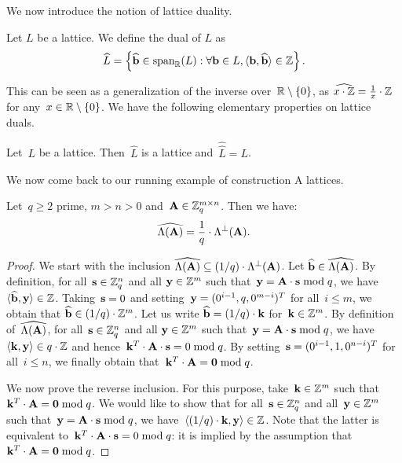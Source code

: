 We now introduce the notion of lattice duality. 

\begin{definition}
\label{def:dual}
Let $L$ be a lattice. We define the dual of $L$ as 
\[
\widehat{L} = \left\{ \widehat{\bf b} \in \mbox{span}_{\mathbb{R}} (L): \forall {\bf b} \in L, \langle{\bf b},\widehat{\bf b}\rangle \in \mathbb{Z} \right\}.
\]
\end{definition}

This can be seen as a generalization of the inverse over~$\mathbb{R} \setminus \{0\}$, as $\widehat{x \cdot \mathbb{Z}} = \frac{1}{x} \cdot \mathbb{Z}$ for any~$x \in \mathbb{R} \setminus \{0\}$. We have the following elementary properties on lattice duals. 

\begin{lemma}
\label{le:dual_props}
Let~$L$ be a lattice. Then~$\widehat{L}$ is a lattice and~$\widehat{\widehat{L}} = L$.
\end{lemma}

We now come back to our running example of construction A lattices.

\begin{lemma}
\label{le:constA_dual}
Let~$q\geq 2$ prime, $m>n>0$ and~${\bf A} \in \mathbb{Z}_q^{m \times n}$. Then we have:
\[\widehat{\Lambda({\bf A})} = \frac{1}{q} \cdot \Lambda^\perp({\bf A}).\] 
\end{lemma}

\begin{proof}
We start with the inclusion $\widehat{\Lambda({\bf A})} \subseteq  (1/q) \cdot \Lambda^\perp({\bf A})$. 
Let $\widehat{\bf b} \in \widehat{\Lambda({\bf A})}$. By definition, for 
all~${\bf s} \in \mathbb{Z}_q^n$ and all ${\bf y} \in \mathbb{Z}^m$ such that~${\bf y} = {\bf A}\cdot {\bf s} \bmod q$, 
we have~$\langle\widehat{\bf b},{\bf y}\rangle \in \mathbb{Z}$. Taking~${\bf s}= 0$ and setting~${\bf y} = (0^{i-1},q,0^{m-i})^T$ for all~$i \leq m$, we obtain that $\widehat{\bf b} \in (1/q) \cdot \mathbb{Z}^m$. Let us write $\widehat{\bf b} = (1/q) \cdot {\bf k}$ for~${\bf k} \in \mathbb{Z}^m$. 
By definition of~$\widehat{\Lambda({\bf A})}$, for 
all~${\bf s} \in \mathbb{Z}_q^n$ and all ${\bf y} \in \mathbb{Z}^m$ such that~${\bf y} = {\bf A}\cdot {\bf s} \bmod q$, 
we have~$\langle{\bf k},{\bf y}\rangle \in q \cdot \mathbb{Z}$ and hence~${\bf k}^T \cdot {\bf A} \cdot {\bf s} = 0 \bmod q$. By setting~${\bf s} = (0^{i-1},1,0^{n-i})^T$ for all~$i \leq n$, we finally obtain that~${\bf k}^T \cdot {\bf A}= {\bf 0} \bmod q$.

We now prove the reverse inclusion. For this purpose, take~${\bf k} \in \mathbb{Z}^m$ such that ${\bf k}^T \cdot {\bf A}= {\bf 0} \bmod q$.
We would like to show that for all~${\bf s} \in \mathbb{Z}_q^n$ and all~${\bf y} \in \mathbb{Z}^m$ such that~${\bf y} = {\bf A} \cdot {\bf s} \bmod q$, we have~$\langle(1/q) \cdot {\bf k},{\bf y} \rangle \in \mathbb{Z}$. Note that the latter is equivalent to~${\bf k}^T \cdot {\bf A} \cdot {\bf s} = 0 \bmod q$: it is implied by the assumption that  ${\bf k}^T \cdot {\bf A}= {\bf 0} \bmod q$.
\end{proof}



